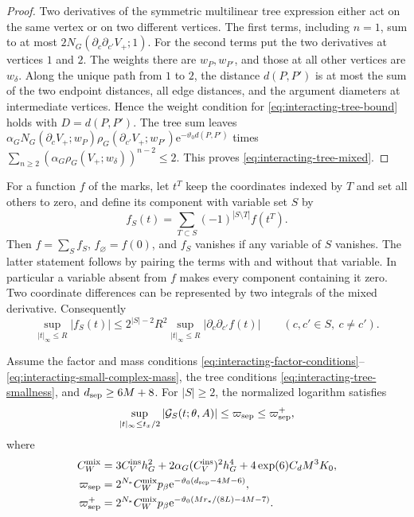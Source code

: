 \begin{proof}
Two derivatives of the symmetric multilinear
tree expression either act on the same vertex
or on two different vertices. The first
terms, including $n=1$, sum to at most
$2N_G(\partial_c\partial_{c'}V_+;1)$.
For the second terms put the two derivatives
at vertices $1$ and $2$. The weights there
are $w_P,w_{P'}$, and those at all other
vertices are $w_\delta$.
Along the unique path from $1$ to $2$,
the distance $d(P,P')$ is at most the
sum of the two endpoint distances, all
edge distances, and the argument diameters
at intermediate vertices. Hence the weight
condition for \eqref{eq:interacting-tree-bound}
holds with $D=d(P,P')$. The tree sum leaves
$\alpha_GN_G(\partial_cV_+;w_P)
\rho_G(\partial_{c'}V_+;w_{P'})
\mathrm e^{-\vartheta_0d(P,P')}$ times
$\sum_{n\ge2}(\alpha_G\rho_G(V_+;w_\delta))^{n-2}\le2$.
This proves \eqref{eq:interacting-tree-mixed}.
\end{proof}

For a function $f$ of the marks, let
$t^T$ keep the coordinates indexed by $T$
and set all others to zero, and define
its component with variable set $S$ by
\[
 f_S(t)=\sum_{T\subset S}(-1)^{|S\setminus T|}f(t^T).
\]
Then $f=\sum_Sf_S$, $f_\varnothing=f(0)$,
and $f_S$ vanishes if any variable of $S$
vanishes. The latter statement follows by
pairing the terms with and without that
variable. In particular a variable absent
from $f$ makes every component containing
it zero. Two coordinate differences can
be represented by two integrals of the
mixed derivative. Consequently
\begin{equation}\label{eq:interacting-Mobius-bound}
 \sup_{|t|_\infty\le R}|f_S(t)|
 \le2^{|S|-2}R^2
          \sup_{|t|_\infty\le R}|\partial_c\partial_{c'}f(t)|
 \qquad(c,c'\in S,\ c\ne c').
\end{equation}

\begin{proposition}\label{prop:interacting-mixed-logarithm}
Assume the factor and mass conditions
\eqref{eq:interacting-factor-conditions}--\eqref{eq:interacting-small-complex-mass},
the tree conditions \eqref{eq:interacting-tree-smallness}, and
$d_{\rm sep}\ge6M+8$. For $|S|\ge2$, the normalized logarithm satisfies
\begin{equation}\label{eq:interacting-mixed-logarithm}
 \sup_{|t|_\infty\le t_x/2}|\mathcal G_S(t;\theta,A)|
                     \le\varpi_{\rm sep}\le\varpi_{\rm sep}^+,
\end{equation}
where
\begin{align}
 C_W^{\mathrm{mix}}&=3C_V^{\mathrm{ins}}h_G^2+2\alpha_G(C_V^{\mathrm{ins}})^2h_G^4
                             +4\exp(6)C_dM^3K_0,\notag\\
 \varpi_{\rm sep}&=2^{N_*}C_W^{\mathrm{mix}}p_\beta
                    \mathrm e^{-\vartheta_0(d_{\rm sep}-4M-6)},\notag\\
 \varpi_{\rm sep}^+&=2^{N_*}C_W^{\mathrm{mix}}p_\beta
                    \mathrm e^{-\vartheta_0(Mr_*/(8L)-4M-7)} .
                                  \label{eq:interacting-separation-errors}
\end{align}
\end{proposition}

